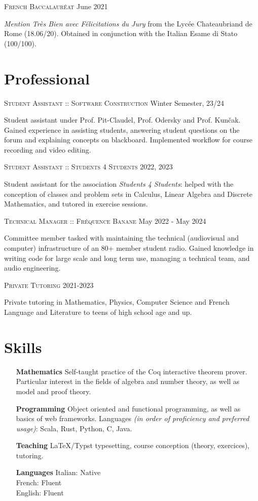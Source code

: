 \documentclass[11pt]{article}
\renewcommand{\line}[2]{{\vspace{4pt} \large \noindent\textsc{#1} \hfill #2}\vspace{4pt}}
\begin{document}
  \line{French Baccalauréat}{June 2021}

  \textit{Mention Très Bien avec Félicitations du Jury} from the Lycée Chateaubriand de Rome (18.06/20). Obtained in conjunction with the Italian Esame di Stato (100/100).
  
  \section*{Professional}

  \line{Student Assistant :: Software Construction}{Winter Semester, 23/24}

  Student assistant under Prof. Pit-Claudel, Prof. Odersky and Prof. Kunčak. Gained experience in assisting students, answering student questions on the forum and explaining concepts on blackboard. Implemented workflow for course recording and video editing.

  \line{Student Assistant :: Students 4 Students}{2022, 2023}

  Student assistant for the association \textit{Students 4 Students}: helped with the conception of classes and problem sets in Calculus, Linear Algebra and Discrete Mathematics, and tutored in exercise sessions.

  \line{Technical Manager :: Fréquence Banane}{May 2022 - May 2024}

  Committee member tasked with maintaining the technical (audiovisual and computer) infrastructure of an 80+ member student radio. Gained knowledge in writing code for large scale and long term use, managing a technical team, and audio engineering.

  \line{Private Tutoring}{2021-2023}

  Private tutoring in Mathematics, Physics, Computer Science and French Language and Literature to teens of high school age and up.

  \section*{Skills}
  
  \begin{adjustwidth}{1in}{}
    \begin{itemize}
      \item[\textbf{Mathematics}] Self-taught practice of the Coq interactive theorem prover. Particular interest in the fields of algebra and number theory, as well as model and proof theory. 
      \item[\textbf{Programming}] Object oriented and functional programming, as well as basics of web frameworks. Languages \textit{(in order of proficiency and preferred usage)}: Scala, Rust, Python, C, Java. 
      \item[\textbf{Teaching}] LaTeX/Typst typesetting, course conception (theory, exercices), tutoring.
      \item[\textbf{Languages}] Italian: Native \\ French: Fluent \\ English: Fluent
    \end{itemize}
  \end{adjustwidth}
\end{document}
